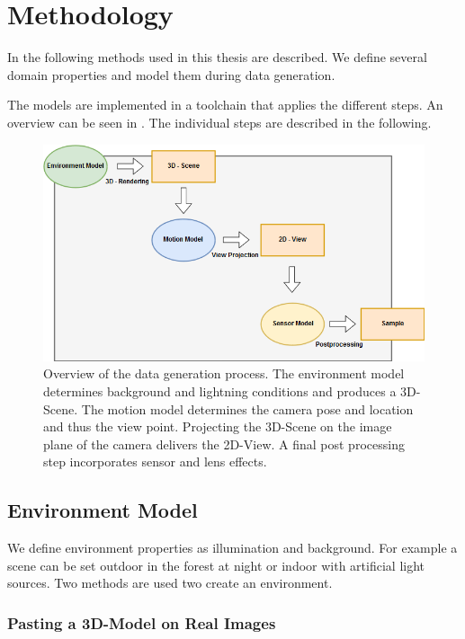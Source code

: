 \section{Methodology}
\label{sec:training:meth}

In the following methods used in this thesis are described. We define several domain properties and model them during data generation.

The models are implemented in a toolchain that applies the different steps. An overview can be seen in  . The individual steps are described in the following.

\begin{figure}[htbp]
	\centering
	\includegraphics[width=\textwidth]{fig/Toolchain_datagen}
	\caption{Overview of the data generation process. The environment model determines background and lightning conditions and produces a 3D-Scene. The motion model determines the camera pose and location and thus the view point. Projecting the 3D-Scene on the image plane of the camera delivers the 2D-View. A final post processing step incorporates sensor and lens effects.}
	\label{fig:training:toolchain_datagen}
\end{figure}

\subsection{Environment Model}
\label{sec:training:scene}
We define environment properties as illumination and background. For example a scene can be set outdoor in the forest at night or indoor with artificial light sources. Two methods are used two create an environment.

\subsubsection{Pasting a 3D-Model on Real Images}

